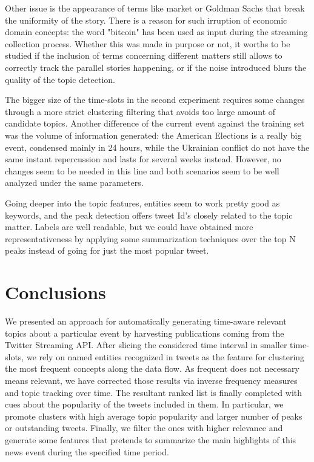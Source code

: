\documentclass{sig-alternate}
\begin{document}
Other issue is the appearance of terms like market or Goldman Sachs that break the uniformity of the story. There is a reason for such irruption of economic domain concepts: the word "bitcoin" has been used as input during the streaming collection process. Whether this was made in purpose or not, it worths to be studied if the inclusion of terms concerning different matters still allows to correctly track the parallel stories happening, or if the noise introduced blurs the quality of the topic detection. 

The bigger size of the time-slots in the second experiment requires some changes through a more strict clustering filtering that avoids too large amount of candidate topics. Another difference of the current event against the training set was the volume of information generated: the American Elections is a really big event, condensed mainly in 24 hours, while the Ukrainian conflict do not have the same instant repercussion and lasts for several weeks instead. However, no changes seem to be needed in this line and both scenarios seem to be well analyzed under the same parameters. 

Going deeper into the topic features, entities seem to work pretty good as keywords, and the peak detection offers tweet Id's closely related to the topic matter. Labels are well readable, but we could have obtained more representativeness by applying some summarization techniques over the top N peaks instead of going for just the most popular tweet.



\section{Conclusions}
We presented an approach for automatically generating time-aware relevant topics about a particular event by harvesting publications coming from the Twitter Streaming API. After slicing the considered time interval in smaller time-slots, we rely on named entities recognized in tweets as the feature for clustering the most frequent concepts along the data flow. As frequent does not necessary means relevant, we have corrected those results via inverse frequency measures and topic tracking over time. The resultant ranked list is finally completed with cues about the popularity of the tweets included in them. In particular, we promote clusters with high average topic popularity and larger number of peaks or outstanding tweets. Finally, we filter the ones with higher relevance and generate some features that pretends to summarize the main highlights of this news event during the specified time period.
\end{document}
